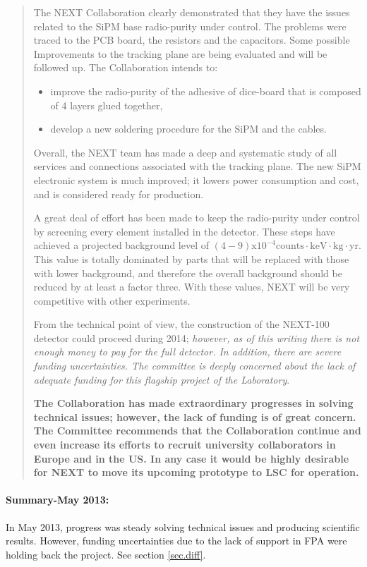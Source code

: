 \begin{quotation}
	
The NEXT Collaboration clearly demonstrated that they have the issues related to the SiPM base radio-purity under control. The problems were traced to the PCB board, the resistors and the capacitors.
Some possible Improvements to the tracking plane are being evaluated and will be followed up. The Collaboration intends to:
\begin{itemize}
\item improve the radio-purity of the adhesive of dice-board that is composed of 4 layers glued together,
\item develop a new soldering procedure for the  SiPM and the cables.
\end{itemize}

	
Overall, the NEXT team has made a deep and systematic study of all services and connections associated with the tracking plane. The new SiPM electronic system is much improved; it lowers power consumption and cost, and is considered ready for production.

A great deal of effort has been made to keep the radio-purity under control by screening every element installed in the detector. These steps have achieved a projected background level of $\mathrm{(4-9) x 10^{-4} counts \cdot keV \cdot kg \cdot yr}$. This value is totally dominated by parts that will be replaced with those with lower background, and therefore the overall background should be reduced by at least a factor three. With these values, NEXT will be very competitive with other experiments.

From the technical point of view, the construction of the NEXT-100 detector could proceed during 2014; {\em however, as of this writing there is not enough money to pay for the full detector. In addition, there are severe funding uncertainties. The committee is deeply concerned about the lack of adequate funding for this flagship project of the Laboratory}.

{\bf
	The Collaboration has made extraordinary progresses in solving technical issues; however, the lack of funding is of great concern. The Committee recommends that the Collaboration continue and even increase its efforts to recruit university collaborators in Europe and in the US. In any case it would be highly desirable for NEXT to move its upcoming prototype to LSC for operation.
}
\end{quotation}

\paragraph{Summary-May 2013:} In May 2013, progress was steady solving technical issues and producing scientific results. However, funding uncertainties due to the lack of support in FPA were holding back the project. See section \ref{sec.diff}.

